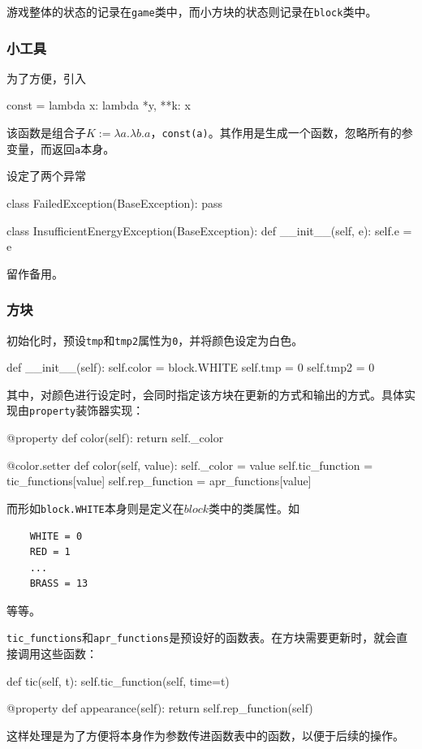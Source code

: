 \documentclass[UTF8]{article}
\begin{document}
游戏整体的状态的记录在\texttt{game}类中，而小方块的状态则记录在\texttt{block}类中。

\subsubsection{小工具} 为了方便，引入
\begin{python}
const = lambda x: lambda *y, **k: x
\end{python}
该函数是组合子$K := \lambda a.\lambda b. a$，\texttt{const(a)}。其作用是生成一个函数，忽略所有的参变量，而返回\texttt{a}本身。

设定了两个异常
\begin{python}
class FailedException(BaseException):
    pass

class InsufficientEnergyException(BaseException):
    def __init__(self, e):
        self.e = e
\end{python}
留作备用。

\subsubsection{方块} 初始化时，预设\texttt{tmp}和\texttt{tmp2}属性为\texttt{0}，并将颜色设定为白色。
\begin{python}
    def __init__(self):
        self.color = block.WHITE
        self.tmp   = 0
        self.tmp2  = 0
\end{python}

其中，对颜色进行设定时，会同时指定该方块在更新的方式和输出的方式。具体实现由\texttt{property}装饰器实现：
\begin{python}
    @property
    def color(self):
        return self._color
    
    @color.setter
    def color(self, value):
        self._color = value
        self.tic_function = tic_functions[value]
        self.rep_function = apr_functions[value]
\end{python}
而形如\texttt{block.WHITE}本身则是定义在$block$类中的类属性。如
\begin{verbatim}
    WHITE = 0
    RED = 1
    ...
    BRASS = 13
\end{verbatim}
等等。

\verb|tic_functions|和\verb|apr_functions|是预设好的函数表。在方块需要更新时，就会直接调用这些函数：
\begin{python}
    def tic(self, t):
        self.tic_function(self, time=t)
        
    @property
    def appearance(self):
        return self.rep_function(self)
\end{python}
这样处理是为了方便将本身作为参数传进函数表中的函数，以便于后续的操作。
\end{document}
